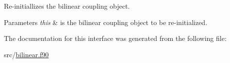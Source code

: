 Re-\/initiallizes the bilinear coupling object. 


\begin{DoxyParams}{Parameters}
{\em this} & is the bilinear coupling object to be re-\/initialized. \\
\hline
\end{DoxyParams}


The documentation for this interface was generated from the following file\-:\begin{DoxyCompactItemize}
\item 
src/\hyperlink{bilinear_8f90}{bilinear.\-f90}\end{DoxyCompactItemize}
